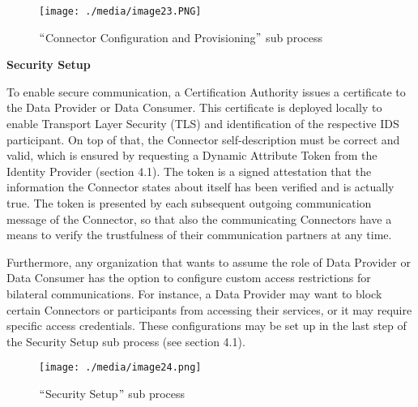 \begin{figure}[H]
	\begin{Center}
		\texttt{[image: ./media/image23.PNG]}
		\caption{ $``$Connector Configuration and Provisioning$"$  sub process}
		\label{ fig:_Connector_Configuration_and_Provisioning_sub_process}
	\end{Center}
\end{figure}



\textbf{Security Setup}

To enable secure communication, a Certification Authority issues a certificate to the Data Provider or Data Consumer. This certificate is deployed locally to enable Transport Layer Security (TLS) and identification of the respective IDS participant. On top of that, the Connector self-description must be correct and valid, which is ensured by requesting a Dynamic Attribute Token from the Identity Provider (section 4.1). The token is a signed attestation that the information the Connector states about itself has been verified and is actually true. The token is presented by each subsequent outgoing communication message of the Connector, so that also the communicating Connectors have a means to verify the trustfulness of their communication partners at any time.

Furthermore, any organization that wants to assume the role of Data Provider or Data Consumer has the option to configure custom access restrictions for bilateral communications. For instance, a Data Provider may want to block certain Connectors or participants from accessing their services, or it may require specific access credentials. These configurations may be set up in the last step of the Security Setup sub process (see section 4.1).




\begin{figure}[H]
	\begin{Center}
		\texttt{[image: ./media/image24.png]}
		\caption{$``$Security Setup$"$  sub process}
		\label{fig:Security_Setup_sub_process}
	\end{Center}
\end{figure}



